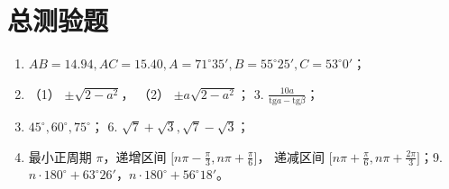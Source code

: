 \section{总测验题}

\begin{enumerate}
\item
  \(AB = 14.94, AC = 15.40, A = 71^{\circ}35', B = 55^{\circ}25', C = 53^{\circ}0'\)；
\item
  （1） \(\pm \sqrt{2 - a^2}\)， （2） \(\pm a\sqrt{2 - a^2}\)； 3.
  \(\frac{10a}{\mathrm{tg}a - \mathrm{tg}\beta}\)；
\item
  \(45^{\circ}, 60^{\circ}, 75^{\circ}\)； 6.
  \(\sqrt{7} + \sqrt{3}, \sqrt{7} - \sqrt{3}\)；
\item
  最小正周期 \(\pi\)，递增区间
  \(\bigl[n\pi - \frac{\pi}{3}, n\pi + \frac{\pi}{6}\bigr]\)，
  递减区间
  \(\bigl[n\pi + \frac{\pi}{6}, n\pi + \frac{2\pi}{3}\bigr]\)；9.
  \(n \cdot 180^{\circ} + 63^{\circ}26'\)，\(n \cdot 180^{\circ} + 56^{\circ}18'\)。
\end{enumerate}
